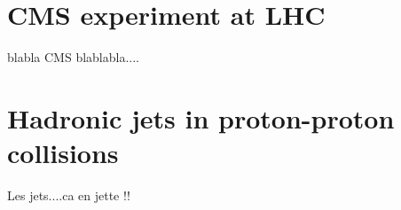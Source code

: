 \label{chap:premierchapitre}

\section{CMS experiment at LHC}

blabla CMS blablabla....

%  

\section{Hadronic jets in proton-proton collisions}

Les jets....ca en jette !!



